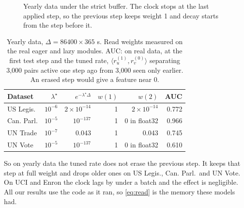 \documentclass[11pt,a4paper]{article}
\theoremstyle{plain}
\theoremstyle{definition}
\begin{document}
\begin{figure}[H]\centering
{}
\caption{Yearly data under the strict buffer. The clock stops at the last applied step, so the previous step keeps weight 1 and decay starts from the step before it.}\label{fig:clock}
\end{figure}

\begin{table}[H]\centering\small
\begin{tabular}{lrrrrr}
\toprule
Dataset & $\lambda^\star$ & $e^{-\lambda^\star\Delta}$ & $w(1)$ & $w(2)$ & AUC\\
\midrule
US Legis. & $10^{-6}$ & $2\times10^{-14}$ & 1 & $2\times10^{-14}$ & 0.772\\
Can. Parl. & $10^{-5}$ & $10^{-137}$ & 1 & 0 in float32 & 0.966\\
UN Trade & $10^{-7}$ & 0.043 & 1 & 0.043 & 0.745\\
UN Vote & $10^{-5}$ & $10^{-137}$ & 1 & 0 in float32 & 0.610\\
\bottomrule
\end{tabular}
\caption{Yearly data, $\Delta=86400\times365$ s. Read weights measured on the real eager and lazy modules. AUC: on real data, at the first test step and the tuned rate, $\langle r_u^{(1)},r_v^{(0)}\rangle$ separating 3,000 pairs active one step ago from 3,000 seen only earlier. An erased step would give a feature near 0.}\label{tab:read}
\end{table}

So on yearly data the tuned rate does not erase the previous step. It keeps that step at full weight and drops older ones on US Legis., Can. Parl.\ and UN Vote. On UCI and Enron the clock lags by under a batch and the effect is negligible. All our results use the code as it ran, so \eqref{eq:read} is the memory these models had.
\end{document}
